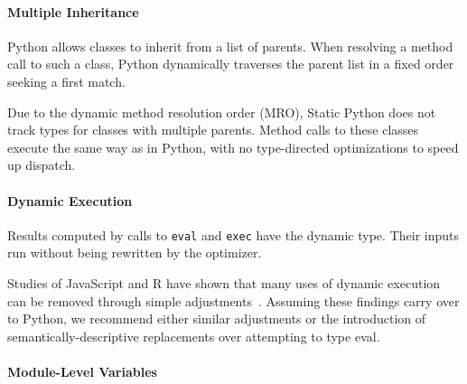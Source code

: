 \documentclass[english,cleveref,submission]{programming}
\newcommand{\SP}{Static Python}
\newcommand{\code}[1]{\texttt{#1}}
\begin{document}


\paragraph{Multiple Inheritance}


Python allows classes to inherit from a list of parents.
When resolving a method call to such a class, Python
dynamically traverses the parent list in a fixed order
seeking a first match.

Due to the dynamic method resolution order (MRO),
\SP{} does not track types for classes with multiple parents.
Method calls to these classes execute the same way as
in Python, with no type-directed optimizations to speed up dispatch.


\paragraph{Dynamic Execution}
Results computed by calls to \code{eval} and \code{exec}
have the dynamic type.
Their inputs run without being rewritten
by the optimizer.

Studies of JavaScript and R have shown that many uses of dynamic execution
can be removed through simple adjustments~\cite{rhbv-ecoop-2011,gdkkv-oopsla-2021,mrmv-esop-2012}.
Assuming these findings carry over to Python, we recommend either similar
adjustments or the introduction of semantically-descriptive replacements
over attempting to type eval.


\paragraph{Module-Level Variables}
\end{document}

